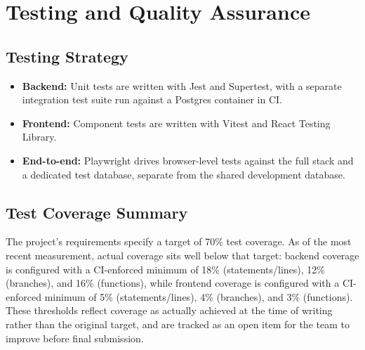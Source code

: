 \documentclass[12pt]{article}
\begin{document}
\section{Testing and Quality Assurance}

\subsection{Testing Strategy}
\begin{itemize}[leftmargin=1.4em]
\item \textbf{Backend:} Unit tests are written with Jest and Supertest, with a separate integration test suite run against a Postgres container in CI.
\item \textbf{Frontend:} Component tests are written with Vitest and React Testing Library.
\item \textbf{End-to-end:} Playwright drives browser-level tests against the full stack and a dedicated test database, separate from the shared development database.
\end{itemize}

\subsection{Test Coverage Summary}
The project's requirements specify a target of 70\% test coverage. As of the most recent measurement, actual coverage sits well below that target: backend coverage is configured with a CI-enforced minimum of 18\% (statements/lines), 12\% (branches), and 16\% (functions), while frontend coverage is configured with a CI-enforced minimum of 5\% (statements/lines), 4\% (branches), and 3\% (functions). These thresholds reflect coverage as actually achieved at the time of writing rather than the original target, and are tracked as an open item for the team to improve before final submission.
\end{document}
